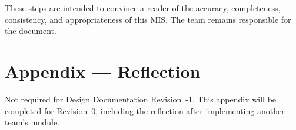 \documentclass[12pt, titlepage]{article}
\begin{document}
These steps are intended to convince a reader of the accuracy, completeness,
consistency, and appropriateness of this MIS. The team remains responsible for
the document.

\newpage

\section{Appendix --- Reflection}

Not required for Design Documentation Revision~-1. This appendix will be
completed for Revision~0, including the reflection after implementing another
team's module.



\end{document}
